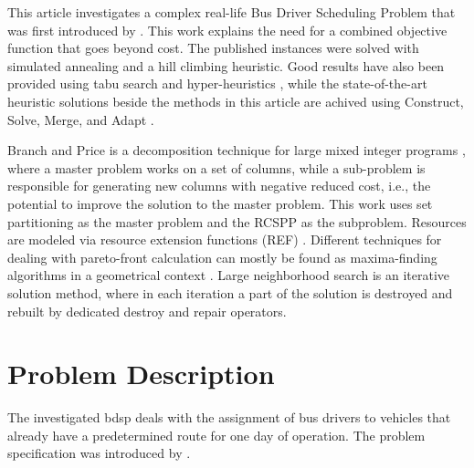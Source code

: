 \documentclass[]{amsart}
\theoremstyle{plain}
\begin{document}
This article investigates a complex real-life Bus Driver Scheduling Problem that was first introduced by \cite{kletzander2020solving}. This work explains the need for a combined objective function that goes beyond cost. The published instances were solved with simulated annealing and a hill climbing heuristic. Good results have also been provided using tabu search \cite{Kletzander2022} and hyper-heuristics \cite{Kletzander2022,Kletzander2023last}, while the state-of-the-art heuristic solutions beside the methods in this article are achived using Construct, Solve, Merge, and Adapt \cite{Rosati2023}.

Branch and Price is a decomposition technique for large mixed integer programs \cite{barnhart1998branch}, where a master problem works on a set of columns, while a sub-problem is responsible for generating new columns with negative reduced cost, i.e., the potential to improve the solution to the master problem. This work uses set partitioning \cite{balas1976set} as the master problem and the RCSPP \cite{irnich2005shortest} as the subproblem. Resources are modeled via resource extension functions (REF) \cite{irnich2008resource}. Different techniques for dealing with pareto-front calculation can mostly be found as maxima-finding algorithms in a geometrical context \cite{bentley1980multidimensional,chen2012maxima}. Large neighborhood search \cite{Shaw1998} is an iterative solution method, where in each iteration a part of the solution is destroyed and rebuilt by dedicated destroy and repair operators.


\section{Problem Description} \label{sec:ProblDef}

The investigated \acrfull{bdsp} deals with the assignment of bus drivers to vehicles that already have a predetermined route for one day of operation. The problem specification was introduced by \cite{kletzander2020solving}. 
\end{document}
